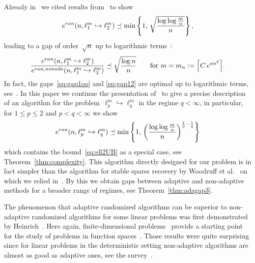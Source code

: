 \documentclass[12pt]{article}
\theoremstyle{plain}
\theoremstyle{definition}
\newcommand{\ran}{\textup{ran}}
\newcommand{\nonada}{\textup{nonada}}
\newcommand{\embed}{\hookrightarrow}
\begin{document}
Already in~\cite[Thm~3.1]{KNW24} we cited results from~\cite{IPW11,LNW17,LNW18} to show
\begin{equation} \label{eq:ell2UB}
    e^{\ran}(n,\ell_1^m \embed \ell_2^m)
        \preceq \min\left\{1,\, \sqrt{\frac{\log \log \frac{m}{n}}{n}} \right\} ,
\end{equation}
leading to a gap of order~$\sqrt{n}$ up to logarithmic terms~\cite[Cor~3.3]{KNW24}:
\begin{equation} \label{eq:gap12}
    \frac{e^{\ran}(n,\ell_1^m \embed \ell_2^m)
        }{e^{\ran,\nonada}(n,\ell_1^m \embed \ell_2^m)}
        \preceq \sqrt{\frac{\log n}{n}}
    \qquad\text{for $m = m_n := \left\lceil C\, e^{an^2} \right\rceil$.}
\end{equation}
In fact, the gaps~\eqref{eq:gap1oo} and \eqref{eq:gap12} are optimal up to logarithmic terms, see~\cite{KNU24}.
In this paper we continue the presentation of~\cite{KW24b} to give a precise description of an algorithm for the problem~$\ell_p^m \embed \ell_q^m$ in the regime
$q < \infty$,
in particular, for $1 \leq p \leq 2$ and $p < q < \infty$ we show
\begin{equation*}
    e^{\ran}(n,\ell_p^m \embed \ell_q^m)
        \preceq \min\left\{1,\, \left(\frac{\log \log \frac{m}{n}}{n}\right)^{\frac{1}{p} - \frac{1}{q}} \right\}
\end{equation*}
which contains the bound~\eqref{eq:ell2UB} as a special case,
see Theorem~\ref{thm:complexity}.
This algorithm directly designed for our problem is in fact simpler than the algorithm for stable sparse recovery by Woodruff et al.~\cite{LNW17,LNW18} on which we relied in~\cite{KNW24}.
By this we obtain gaps between adaptive and non-adaptive methods for a broader range of regimes, see Theorem~\ref{thm:adagap3}.

The phenomenon that adaptive randomized algorithms can be superior to non-adaptive randomized algorithms for some linear problems was first demonstrated by Heinrich~\cite{He24,He22,He23b,He23}. %
Here again, finite-dimensional problems~\cite{He24,He22,He23}
provide a starting point for the study of problems 
in function spaces~\cite{He23b}. 
Those results were quite surprising since for linear problems in the deterministic setting non-adaptive algorithms are almost as good as adaptive ones, see the survey~\cite{No96}.
\end{document}

